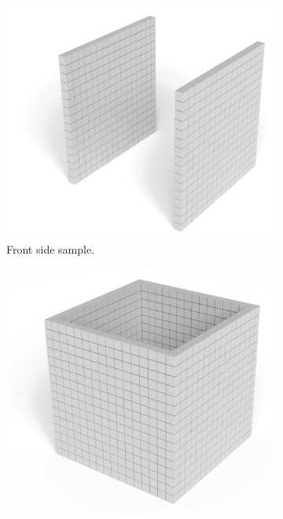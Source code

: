 \begin{figure}[h]
    \centering
    \begin{subfigure}[t]{0.3\textwidth}
        \centering
        \includegraphics[width=\textwidth]{sections/methodology/figures/voxels-merge-1.png}
        \caption{Front side sample.}
        \label{fig:filling-non-watertight-model}
    \end{subfigure}
    \hfill
    \begin{subfigure}[t]{0.3\textwidth}
        \centering
        \includegraphics[width=\textwidth]{sections/methodology/figures/voxels-merge-2.png}

\end{subfigure}
\end{figure}
